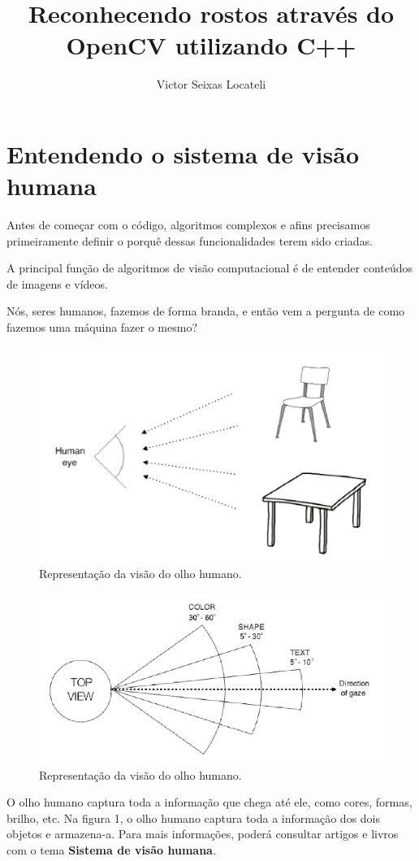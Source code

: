 \documentclass[12pt]{article}
\author{Victor Seixas Locateli}
\title{Reconhecendo rostos através do OpenCV utilizando C++}
\begin{document}
	\maketitle
	\newpage
	\section{Entendendo o sistema de visão humana}
	Antes de começar com o código, algoritmos complexos e afins precisamos primeiramente definir o porquê dessas funcionalidades terem sido criadas. 
	
	A principal função de algoritmos de visão computacional é de entender conteúdos de imagens e vídeos.
	
	Nós, seres humanos, fazemos de forma branda, e então vem a pergunta de como fazemos uma máquina fazer o mesmo?
	\begin{figure}[ht!]
	\centering
	\includegraphics[width=\textwidth]{human_eye}
	\caption{Representação da visão do olho humano.}
	\end{figure}
	\newpage
		\begin{figure}[ht!]
		\centering
		\includegraphics[width=\textwidth]{in_depth_human_eye}
		\caption{Representação da visão do olho humano.}
	\end{figure}
	O olho humano captura toda a informação que chega até ele, como cores, formas, brilho, etc.
	Na figura 1, o olho humano captura toda a informação dos dois objetos e armazena-a.
	Para mais informações, poderá consultar artigos e livros com o tema \textbf{Sistema de visão humana}.
	
\end{document}
